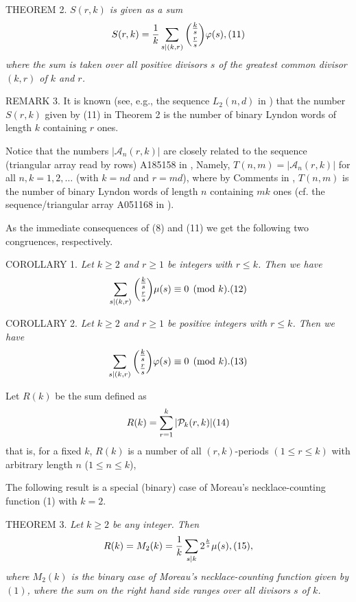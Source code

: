 \documentclass[12pt]{amsart}
\begin{document}
{T{\scriptsize HEOREM} 2.    {\it $S(r,k)$ is given as a sum
     $$
S(r,k)=\frac{1}{k}\sum_{s|(k,r)}{\frac{k}{s}\choose\frac{r}{s}}
\varphi(s),\relax(11)
 $$
 where the sum 
is taken
 over all positive divisors $s$ of the greatest common divisor $(k,r)$ of $k$ 
and $r$.}

\vspace{2mm}


R{\scriptsize EMARK} 3.  It is known (see, e.g., the sequence 
 $L_2(n,d)$ in 
\cite{http})  that the 
number $S(r,k)$ given by (11) in Theorem 2 is the number of 
 binary Lyndon words of length $k$ containing $r$ ones.

\vspace{2mm}

 Notice that the numbers 
$|{\mathcal A}_n(r,k)|$ are closely related to the sequence 
(triangular array read by rows) A185158 in \cite{oe}, Namely, 
$T(n,m)=|{\mathcal A}_n(r,k)|$ for all $n,k=1,2,\ldots$ 
(with $k=nd$ and $r=md$), where by   Comments in \cite{oe}, $T(n,m)$  is 
the number of binary Lyndon words of length $n$ containing $mk$ ones
(cf. the sequence/triangular array  A051168 in \cite{oe}).


As  the immediate consequences of (8) and (11) 
 we get the following  two congruences,  respectively.  

\vspace{2mm}

C{\scriptsize OROLLARY} 1. {\it Let $k\ge 2$ and $r\ge 1$ be  
integers  with $r\le k$. Then we have}
        $$
\sum_{s|(k,r)}{\frac{k}{s}\choose\frac{r}{s}}\mu(s)\equiv 0\pmod{k}.
\relax (12)
 $$


C{\scriptsize OROLLARY} 2.  {\it Let $k\ge 2$ and $r\ge 1$ be  
positive integers  with $r\le k$. Then we have}
       $$
\sum_{s|(k,r)}{\frac{k}{s}\choose\frac{r}{s}}\varphi (s)\equiv 0\pmod{k}.
\relax (13)
 $$
\vspace{1mm}

 

 Let $R(k)$ be the sum defined as  
 $$
R(k)=\sum_{r=1}^{k}|{\mathcal P}_k(r,k)|\relax (14)
  $$ 
that is, for a fixed $k$, $R(k)$ 
is a number of all  $(r,k)$-periods $(1\le r\le k)$ with arbitrary length
$n$  ($1\le n\le k$),

The following result is a special (binary) case of 
Moreau's necklace-counting function (1) with $k=2$.

\vspace{2mm}

T{\scriptsize HEOREM} 3.
{\it Let $k\ge 2$ be any integer. Then 
 $$
R(k)=M_2(k)=\frac{1}{k}\sum_{s|k}2^{\frac{k}{s}}\mu(s),\relax(15),
  $$
where $M_2(k)$ is the binary case of 
Moreau's necklace-counting function  given by $(1)$,
 where the sum on the right hand side ranges over all divisors $s$ of $k$.}

}
\end{document}
